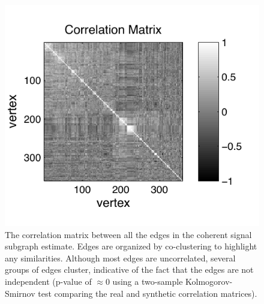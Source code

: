 \documentclass[10pt,journal,cspaper,compsoc]{IEEEtran}
\begin{document}
% 
% 
% 
% 
% 



\begin{figure}[htbp]
	\centering
		\includegraphics[width=1.0\linewidth]{../figs/BLSA0317_coclustered_corr.pdf}
	\caption{The correlation matrix between all the edges in the coherent signal subgraph estimate. Edges are organized by co-clustering to highlight any similarities.  Although most edges are uncorrelated, several groups of edges cluster, indicative of the fact that the edges are not independent (p-value of $\approx 0$ using a two-sample Kolmogorov-Smirnov test comparing the real and synthetic correlation matrices). }
	\label{fig:cov}
\end{figure}
\end{document}
